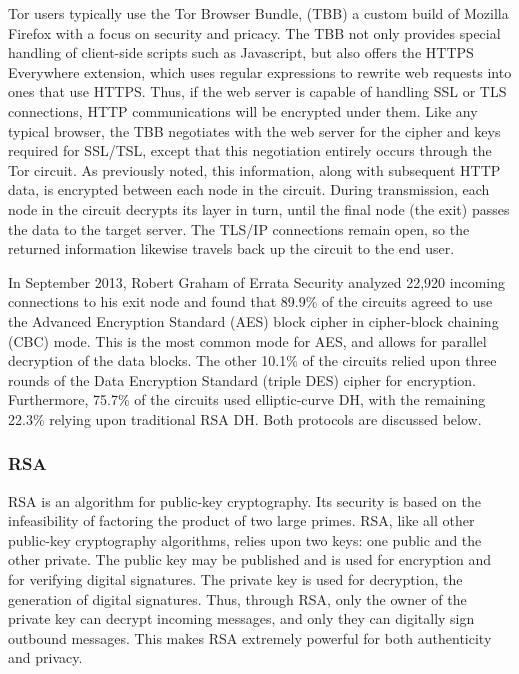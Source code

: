 \documentclass[journal]{IEEEtran}
\begin{document}
Tor users typically use the Tor Browser Bundle, (TBB) a custom build of Mozilla Firefox with a focus on security and pricacy. The TBB not only provides special handling of client-side scripts such as Javascript, but also offers the HTTPS Everywhere extension, which uses regular expressions to rewrite web requests into ones that use HTTPS. Thus, if the web server is capable of handling SSL or TLS connections, HTTP communications will be encrypted under them. Like any typical browser, the TBB negotiates with the web server for the cipher and keys required for SSL/TSL, except that this negotiation entirely occurs through the Tor circuit. As previously noted, this information, along with subsequent HTTP data, is encrypted between each node in the circuit. During transmission, each node in the circuit decrypts its layer in turn, until the final node (the exit) passes the data to the target server. The TLS/IP connections remain open, so the returned information likewise travels back up the circuit to the end user.

In September 2013, Robert Graham of Errata Security analyzed 22,920 incoming connections to his exit node and found that 89.9\% of the circuits agreed to use the Advanced Encryption Standard (AES) block cipher in cipher-block chaining (CBC) mode. This is the most common mode for AES, and allows for parallel decryption of the data blocks. The other 10.1\% of the circuits relied upon three rounds of the Data Encryption Standard (triple DES) cipher for encryption. Furthermore, 75.7\% of the circuits used elliptic-curve DH, with the remaining 22.3\% relying upon traditional RSA DH.\cite{Graham2013} Both protocols are discussed below.

\subsubsection{RSA}

RSA is an algorithm for public-key cryptography. Its security is based on the infeasibility of factoring the product of two large primes. RSA, like all other public-key cryptography algorithms, relies upon two keys: one public and the other private. The public key may be published and is used for encryption and for verifying digital signatures. The private key is used for decryption, the generation of digital signatures. Thus, through RSA, only the owner of the private key can decrypt incoming messages, and only they can digitally sign outbound messages. This makes RSA extremely powerful for both authenticity and privacy.
\end{document}
